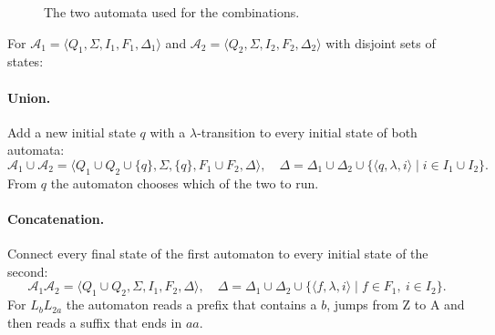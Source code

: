 \begin{figure}[h]
\centering
{}
\hspace{1.2cm}
\caption{The two automata used for the combinations.}
\label{fig:lb-l2a}
\end{figure}

For $\mathcal{A}_1 = \langle Q_1, \Sigma, I_1, F_1, \Delta_1 \rangle$ and
$\mathcal{A}_2 = \langle Q_2, \Sigma, I_2, F_2, \Delta_2 \rangle$ with disjoint
sets of states:

\paragraph{Union.} Add a new initial state $q$ with a $\lambda$-transition to
every initial state of both automata:
\[
\mathcal{A}_1 \cup \mathcal{A}_2 = \langle Q_1 \cup Q_2 \cup \{q\}, \Sigma, \{q\}, F_1 \cup F_2, \Delta \rangle,
\quad
\Delta = \Delta_1 \cup \Delta_2 \cup \{ \langle q, \lambda, i \rangle \mid i \in I_1 \cup I_2 \}.
\]
From $q$ the automaton chooses which of the two to run.

\paragraph{Concatenation.} Connect every final state of the first automaton
to every initial state of the second:
\[
\mathcal{A}_1\mathcal{A}_2 = \langle Q_1 \cup Q_2, \Sigma, I_1, F_2, \Delta \rangle,
\quad
\Delta = \Delta_1 \cup \Delta_2 \cup \{ \langle f, \lambda, i \rangle \mid f \in F_1,\ i \in I_2 \}.
\]
For $L_b L_{2a}$ the automaton reads a prefix that contains a $b$, jumps from
Z to A and then reads a suffix that ends in $aa$.

